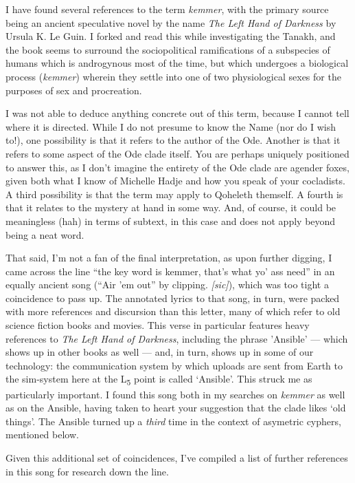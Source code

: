 I have found several references to the term \emph{kemmer}, with the primary source being an ancient speculative novel by the name \emph{The Left Hand of Darkness} by Ursula K. Le Guin. I forked and read this while investigating the Tanakh, and the book seems to surround the sociopolitical ramifications of a subspecies of humans which is androgynous most of the time, but which undergoes a biological process (\emph{kemmer}) wherein they settle into one of two physiological sexes for the purposes of sex and procreation.

I was not able to deduce anything concrete out of this term, because I cannot tell where it is directed. While I do not presume to know the Name (nor do I wish to!), one possibility is that it refers to the author of the Ode. Another is that it refers to some aspect of the Ode clade itself. You are perhaps uniquely positioned to answer this, as I don't imagine the entirety of the Ode clade are agender foxes, given both what I know of Michelle Hadje and how you speak of your cocladists. A third possibility is that the term may apply to Qoheleth themself. A fourth is that it relates to the mystery at hand in some way. And, of course, it could be meaningless (hah) in terms of subtext, in this case and does not apply beyond being a neat word.

That said, I'm not a fan of the final interpretation, as upon further digging, I came across the line ``the key word is kemmer, that's what yo' ass need'' in an equally ancient song (``Air 'em out'' by clipping. \emph{{[}sic{]}}), which was too tight a coincidence to pass up. The annotated lyrics to that song, in turn, were packed with more references and discursion than this letter, many of which refer to old science fiction books and movies. This verse in particular features heavy references to \emph{The Left Hand of Darkness}, including the phrase 'Ansible' — which shows up in other books as well — and, in turn, shows up in some of our technology: the communication system by which uploads are sent from Earth to the sim-system here at the L\textsubscript{5} point is called `Ansible'. This struck me as particularly important. I found this song both in my searches on \emph{kemmer} as well as on the Ansible, having taken to heart your suggestion that the clade likes `old things'. The Ansible turned up a \emph{third} time in the context of asymetric cyphers, mentioned below.

Given this additional set of coincidences, I've compiled a list of further references in this song for research down the line.

